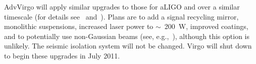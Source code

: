 \documentclass{article}
\begin{document}

AdvVirgo will apply similar upgrades to those for aLIGO and over a similar
timescale (for details see~\cite{AdvVirgoWhitepaper} and~\cite{AdvVirgoDesign}). Plans are
to add a signal recycling mirror, monolithic suspensions, increased laser power
to $\sim$~200~W, improved coatings, and to potentially use non-Gaussian beams (see,
e.g.,~\cite{Freise:2010}), although this option is unlikely. The seismic isolation
system will not be changed. Virgo will shut down to begin these upgrades in July
2011.
\end{document}
